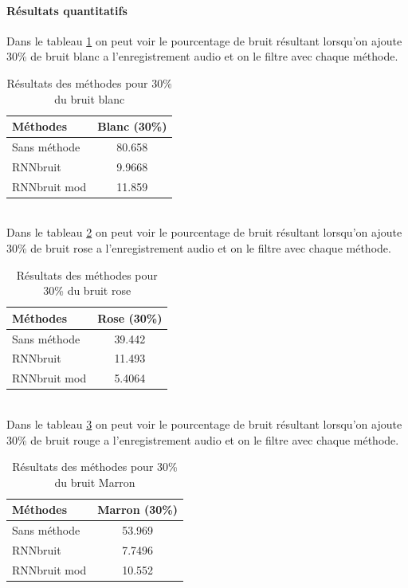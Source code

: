 \documentclass[conference,onecolumn]{IEEEtran}
\begin{document}
\paragraph{Résultats quantitatifs}
Dans le tableau \ref{table:t25} on peut voir le pourcentage de bruit résultant lorsqu’on ajoute 30\% de bruit blanc a l’enregistrement audio et on le filtre avec chaque méthode.
\begin{table}[H]
    \centering
    \begin{tabular}{ l  c }
    \textbf{Méthodes} & \textbf{Blanc (30\%)} \\
    \hline
    Sans méthode & 80.658 \\
    RNNbruit & 9.9668 \\
    RNNbruit mod & 11.859 \\
    \end{tabular}
    \caption{Résultats des méthodes pour 30\% du bruit blanc}
    \label{table:t25}
\end{table}
\hfill \\
Dans le tableau \ref{table:t26} on peut voir le pourcentage de bruit résultant lorsqu’on ajoute 30\% de bruit rose a l’enregistrement audio et on le filtre avec chaque méthode.
\begin{table}[H]
    \centering
    \begin{tabular}{ l  c }
    \textbf{Méthodes} & \textbf{Rose (30\%)} \\
    \hline
    Sans méthode & 39.442 \\
    RNNbruit & 11.493 \\
    RNNbruit mod & 5.4064 \\
    \end{tabular}
    \caption{Résultats des méthodes pour 30\% du bruit rose}
    \label{table:t26}
\end{table}
\hfill \\
Dans le tableau \ref{table:t27} on peut voir le pourcentage de bruit résultant lorsqu’on ajoute 30\% de bruit rouge a l’enregistrement audio et on le filtre avec chaque méthode.
\begin{table}[H]
    \centering
    \begin{tabular}{ l  c }
    \textbf{Méthodes} & \textbf{Marron (30\%)} \\
    \hline
    Sans méthode & 53.969 \\
    RNNbruit & 7.7496 \\
    RNNbruit mod & 10.552 \\
    \end{tabular}
    \caption{Résultats des méthodes pour 30\% du bruit Marron}
    \label{table:t27}
\end{table}
\hfill \\
\end{document}
